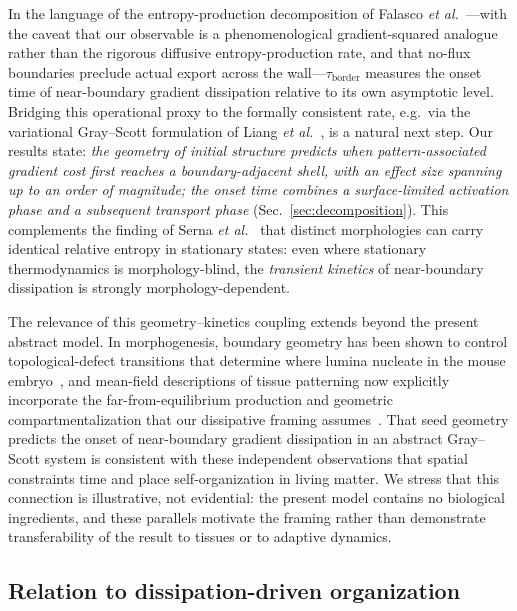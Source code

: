 \documentclass[aps,pre,preprint,superscriptaddress,nofootinbib,floatfix]{revtex4-2}
\newcommand{\tb}{\tau_{\mathrm{border}}}
\begin{document}
In the language of the entropy-production decomposition of Falasco \textit{et al.}~\cite{falasco2018}---with the caveat that our observable is a phenomenological gradient-squared analogue rather than the rigorous diffusive entropy-production rate, and that no-flux boundaries preclude actual export across the wall---$\tb$ measures the onset time of near-boundary gradient dissipation relative to its own asymptotic level. Bridging this operational proxy to the formally consistent rate, e.g.\ via the variational Gray--Scott formulation of Liang \textit{et al.}~\cite{liang2024}, is a natural next step. Our results state: \textit{the geometry of initial structure predicts when pattern-associated gradient cost first reaches a boundary-adjacent shell, with an effect size spanning up to an order of magnitude; the onset time combines a surface-limited activation phase and a subsequent transport phase} (Sec.~\ref{sec:decomposition}). This complements the finding of Serna \textit{et al.}~\cite{serna2017} that distinct morphologies can carry identical relative entropy in stationary states: even where stationary thermodynamics is morphology-blind, the \textit{transient kinetics} of near-boundary dissipation is strongly morphology-dependent.

The relevance of this geometry--kinetics coupling extends beyond the present abstract model. In morphogenesis, boundary geometry has been shown to control topological-defect transitions that determine where lumina nucleate in the mouse embryo~\cite{guruciaga2024}, and mean-field descriptions of tissue patterning now explicitly incorporate the far-from-equilibrium production and geometric compartmentalization that our dissipative framing assumes~\cite{hernandez2026}. That seed geometry predicts the onset of near-boundary gradient dissipation in an abstract Gray--Scott system is consistent with these independent observations that spatial constraints time and place self-organization in living matter. We stress that this connection is illustrative, not evidential: the present model contains no biological ingredients, and these parallels motivate the framing rather than demonstrate transferability of the result to tissues or to adaptive dynamics.

\subsection{Relation to dissipation-driven organization}
\end{document}
